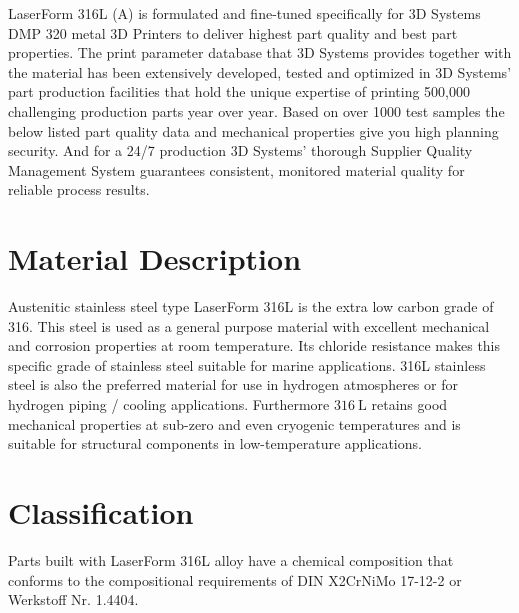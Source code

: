 \documentclass[10pt]{article}
\begin{document}
LaserForm 316L (A) is formulated and fine-tuned specifically for 3D Systems DMP 320 metal 3D Printers to deliver highest part quality and best part properties. The print parameter database that 3D Systems provides together with the material has been extensively developed, tested and optimized in 3D Systems' part production facilities that hold the unique expertise of printing 500,000 challenging production parts year over year. Based on over 1000 test samples the below listed part quality data and mechanical properties give you high planning security. And for a 24/7 production 3D Systems' thorough Supplier Quality Management System guarantees consistent, monitored material quality for reliable process results.

\section*{Material Description}
Austenitic stainless steel type LaserForm 316L is the extra low carbon grade of 316. This steel is used as a general purpose material with excellent mechanical and corrosion properties at room temperature. Its chloride resistance makes this specific grade of stainless steel suitable for marine applications. 316L stainless steel is also the preferred material for use in hydrogen atmospheres or for hydrogen piping / cooling applications. Furthermore $316 \mathrm{~L}$ retains good mechanical properties at sub-zero and even cryogenic temperatures and is suitable for structural components in low-temperature applications.

\section*{Classification}
Parts built with LaserForm 316L alloy have a chemical composition that conforms to the compositional requirements of DIN X2CrNiMo 17-12-2 or Werkstoff Nr. 1.4404.
\end{document}
